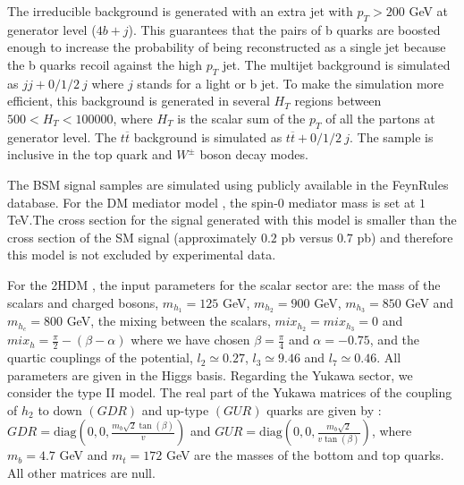 The irreducible background is generated with an extra jet with $p_T>200$ GeV at generator level ($4b+j$). This guarantees that the pairs of b quarks are boosted enough to increase the probability of being reconstructed as a single jet because the b quarks recoil against the high $p_T$ jet. The multijet background is simulated as $jj+0/1/2~j$ where $j$ stands for a light or b jet. To make the simulation more efficient, this background is generated in several $H_T$ regions between $500<H_T<100000$, where $H_T$ is the scalar sum of the $p_T$ of all the partons at generator level. The $t\overline{t}$ background is simulated as $t\overline{t}+0/1/2~j$. The sample is inclusive in the top quark and $W^{\pm}$ boson decay modes.

The BSM signal samples are simulated using publicly available in the FeynRules database. For the DM mediator model \cite{DM}, the spin-$0$ mediator mass is set at $1$ TeV.The cross section for the signal
generated with this model is smaller than the cross section of the SM signal (approximately $0.2$ pb versus $0.7$ pb) and therefore this model is not excluded by experimental data. 

For the 2HDM \cite{2HDM,2HDM1}, the input parameters for the scalar sector are: the mass of the scalars and charged bosons, $m_{h_1}=125$ GeV, $m_{h_2}=900$ GeV, $m_{h_3}=850$ GeV and $m_{h_c}=800$ GeV, the mixing between the scalars, $mix_{h_2}=mix_{h_3}=0$ and $mix_h=\frac{\pi}{2}-(\beta-\alpha)$ where we have chosen $\beta=\frac{\pi}{4}$ and $\alpha=-0.75$, and the quartic couplings of the potential, $l_2\simeq0.27$, $l_3\simeq9.46$ and $l_7\simeq0.46$. All parameters are given in the Higgs basis. Regarding the Yukawa sector, we consider the type II model. The real part of the Yukawa matrices of the coupling of $h_2$ to down $(GDR)$ and up-type $(GUR)$ quarks are given by \cite{2HDM}: $GDR=\text{diag}\left(0,0,\frac{m_b\sqrt{2}\tan(\beta)}{v}\right)$ and $GUR=\text{diag}\left(0,0,\frac{m_b\sqrt{2}}{v\tan(\beta)}\right)$, where $m_b=4.7$ GeV and $m_t=172$ GeV are the masses of the bottom and top quarks. All other matrices are null.  

